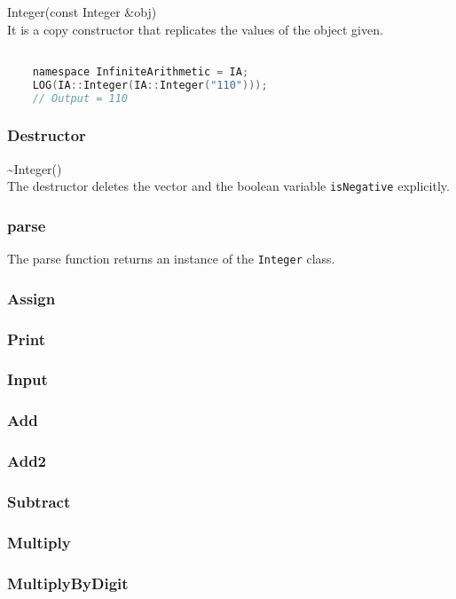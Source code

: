\noindent
{\ttfamily \large Integer(const Integer \&obj)} \\[2mm]
It is a copy constructor that replicates the values of the object given.
\vspace*{1em}
\begin{lstlisting}[language = C]

	namespace InfiniteArithmetic = IA;
	LOG(IA::Integer(IA::Integer("110")));
	// Output = 110
\end{lstlisting}
\vspace*{1em}


\subsubsection{Destructor}
{\ttfamily \large \~{}Integer()} \\[2mm]
The destructor deletes the vector and the boolean variable \verb|isNegative| explicitly.

\subsubsection{parse}
The parse function returns an instance of the \verb|Integer| class.
\subsubsection{Assign}
\subsubsection{Print}
\subsubsection{Input}
\subsubsection{Add}
\subsubsection{Add2}
\subsubsection{Subtract}
\subsubsection{Multiply}
\subsubsection{MultiplyByDigit}
